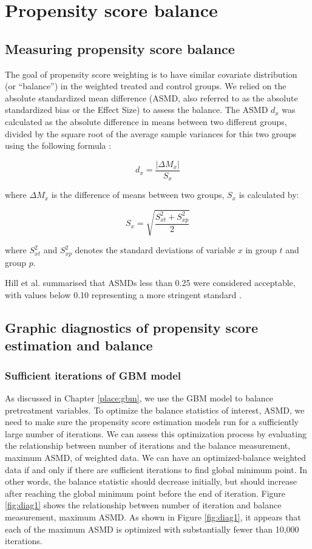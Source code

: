 \documentclass[12pt]{report}
\begin{document}
\chapter{Propensity score balance}
\section{Measuring propensity score balance}
The goal of propensity score weighting is to have similar covariate distribution (or ``balance'') in the weighted treated and control groups. We relied on the absolute standardized mean difference (ASMD, also referred to as the absolute standardized bias or the Effect Size) to assess the balance. The ASMD $d_x$ was calculated as the absolute difference in means between two different groups, divided by the square root of the average sample variances for this two groups using the following formula \citep{haviland2007combining}:

\begin{equation*}
d_x =\frac{|\Delta M_x|}{S_x}
\end{equation*}

where $\Delta M_x$ is the difference of means between two groups, $S_x$ is calculated by: 

\begin{equation*}
S_x=\sqrt{\frac{S^2_{xt}+S^2_{xp}}{2}}
\end{equation*}

where $S^2_{xt}$ and $S^2_{xp}$ denotes the standard deviations of variable $x$ in group $t$ and group $p$.

Hill et al. summarised that ASMDs less than 0.25 were considered acceptable, with values below 0.10 representing a more stringent standard \citep{hillm2015short}.

\section{Graphic diagnostics of propensity score estimation and balance}

\subsection{Sufficient iterations of GBM model}
As discussed in Chapter \ref{place:gbm}, we use the GBM model to balance pretreatment variables. To optimize the balance statistics of interest, ASMD, we need to make sure the propensity score estimation models run for a sufficiently large number of iterations. We can assess this optimization process by evaluating the relationship between number of iterations and the balance measurement, maximum ASMD, of weighted data. We can have an optimized-balance weighted data if and only if there are sufficient iterations to find global minimum point. In other words, the balance statistic should decrease initially, but should increase after reaching the global minimum point before the end of iteration. Figure \ref{fig:diag1} shows the relationship between number of iteration and balance measurement, maximum ASMD. As shown in Figure \ref{fig:diag1}, it appears that each of the maximum ASMD is optimized with substantially fewer than 10,000 iterations.
\end{document}
